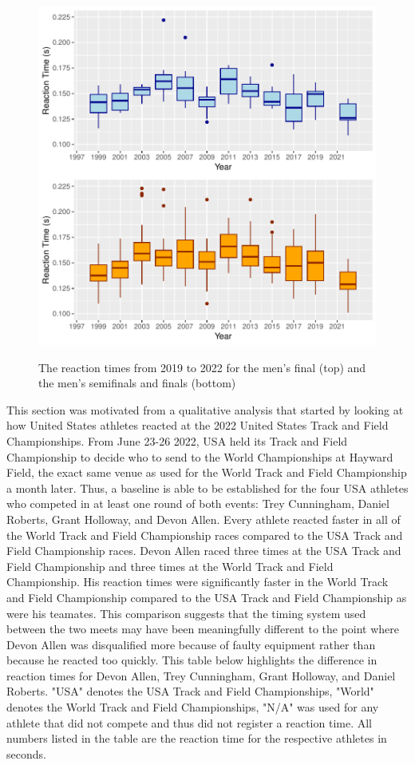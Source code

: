\documentclass[12pt, letterpaper, titlepage]{article}
\begin{document}
\begin{figure}[h]
  \centering
  \includegraphics{Finals_Pooled_Boxplot}
  \label{fig:Boxplots}
  \caption{The reaction times from 2019 to 2022 for the men's final (top) and
  the men's semifinals and finals (bottom)}
\end{figure}

This section was motivated from a qualitative analysis that started by looking
at how United States athletes reacted at the 2022 United States Track and Field
Championships. From June 23-26 2022, USA held its Track
and Field Championship to decide who to send to the World Championships at Hayward 
Field, the exact same venue as used for the World Track and Field Championship a month 
later.  Thus, a baseline is able to be established for the four USA athletes who 
competed in at least one round of both events: Trey Cunningham, Daniel Roberts, 
Grant Holloway, and Devon Allen. Every athlete reacted faster in all of the World 
Track and Field Championship races compared to the USA Track and Field 
Championship races. Devon Allen raced three times at the USA Track and
Field Championship and three times at the World Track and Field  Championship. 
His reaction times were significantly faster in the World Track and
Field Championship compared to the USA Track and Field Championship as were his
teamates.  This comparison suggests that the timing system used between the two
meets may have been meaningfully different to the point where Devon Allen was
disqualified more because of faulty equipment rather than because he reacted
too quickly.  This table below highlights the difference in reaction times for
Devon Allen, Trey Cunningham, Grant Holloway, and Daniel Roberts. "USA" denotes
the USA Track and Field Championships, "World" denotes the World Track and Field
Championships, "N/A" was used for any athlete that did not compete and thus
did not register a reaction time.  All numbers listed in the table are the reaction
time for the respective athletes in seconds. 
\end{document}
